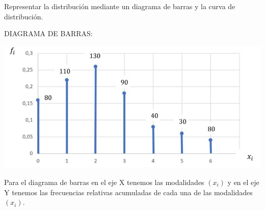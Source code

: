\subproblem
Representar la distribución mediante un diagrama de barras y la curva de distribución.

\begin{center}
DIAGRAMA DE BARRAS:
\begin{center}
	\includegraphics[scale=0.5]{grafica-ej-1.jpeg}

\end{center}
Para el diagrama de barras en el eje X tenemos las modalidades $(x_{i})$ y en el eje Y tenemos las frecuencias relativas acumuladas de cada una de las modalidades $(x_{i})$. \\

\end{center}

